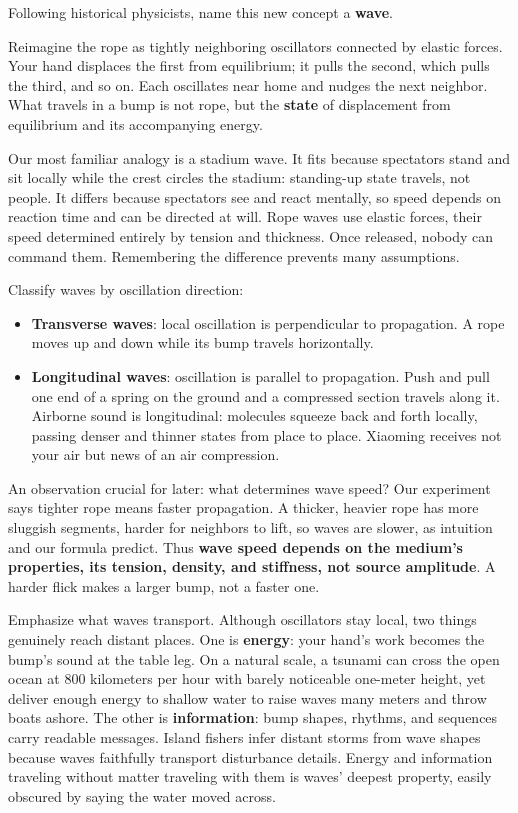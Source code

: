 \begin{mainline}
Following historical physicists, name this new concept a \textbf{wave}.

Reimagine the rope as tightly neighboring oscillators connected by elastic forces. Your hand displaces the first from equilibrium; it pulls the second, which pulls the third, and so on. Each oscillates near home and nudges the next neighbor. What travels in a bump is not rope, but the \textbf{state} of displacement from equilibrium and its accompanying energy.

Our most familiar analogy is a stadium wave. It fits because spectators stand and sit locally while the crest circles the stadium: standing-up state travels, not people. It differs because spectators see and react mentally, so speed depends on reaction time and can be directed at will. Rope waves use elastic forces, their speed determined entirely by tension and thickness. Once released, nobody can command them. Remembering the difference prevents many assumptions.

Classify waves by oscillation direction:

\begin{itemize}
  \item \textbf{Transverse waves}: local oscillation is perpendicular to propagation. A rope moves up and down while its bump travels horizontally.
  \item \textbf{Longitudinal waves}: oscillation is parallel to propagation. Push and pull one end of a spring on the ground and a compressed section travels along it. Airborne sound is longitudinal: molecules squeeze back and forth locally, passing denser and thinner states from place to place. Xiaoming receives not your air but news of an air compression.
\end{itemize}

An observation crucial for later: what determines wave speed? Our experiment says tighter rope means faster propagation. A thicker, heavier rope has more sluggish segments, harder for neighbors to lift, so waves are slower, as intuition and our formula predict. Thus \textbf{wave speed depends on the medium's properties, its tension, density, and stiffness, not source amplitude}. A harder flick makes a larger bump, not a faster one.

Emphasize what waves transport. Although oscillators stay local, two things genuinely reach distant places. One is \textbf{energy}: your hand's work becomes the bump's sound at the table leg. On a natural scale, a tsunami can cross the open ocean at 800 kilometers per hour with barely noticeable one-meter height, yet deliver enough energy to shallow water to raise waves many meters and throw boats ashore. The other is \textbf{information}: bump shapes, rhythms, and sequences carry readable messages. Island fishers infer distant storms from wave shapes because waves faithfully transport disturbance details. Energy and information traveling without matter traveling with them is waves' deepest property, easily obscured by saying the water moved across.
\end{mainline}

